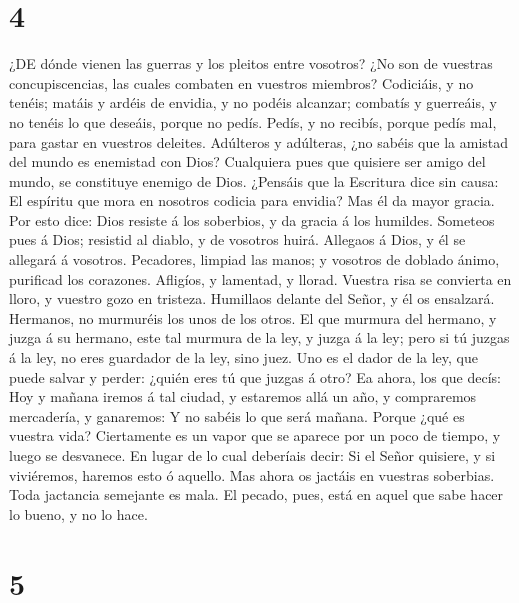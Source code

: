 \hypertarget{section-3}{%
\section{4}\label{section-3}}

 ¿DE dónde vienen las guerras y los pleitos entre vosotros?
¿No son de vuestras concupiscencias, las cuales combaten en vuestros
miembros?  Codiciáis, y no tenéis; matáis y ardéis de
envidia, y no podéis alcanzar; combatís y guerreáis, y no tenéis lo que
deseáis, porque no pedís.  Pedís, y no recibís, porque pedís
mal, para gastar en vuestros deleites.  Adúlteros y
adúlteras, ¿no sabéis que la amistad del mundo es enemistad con Dios?
Cualquiera pues que quisiere ser amigo del mundo, se constituye enemigo
de Dios.  ¿Pensáis que la Escritura dice sin causa: El
espíritu que mora en nosotros codicia para envidia?  Mas él
da mayor gracia. Por esto dice: Dios resiste á los soberbios, y da
gracia á los humildes.  Someteos pues á Dios; resistid al
diablo, y de vosotros huirá.  Allegaos á Dios, y él se
allegará á vosotros. Pecadores, limpiad las manos; y vosotros de doblado
ánimo, purificad los corazones.  Afligíos, y lamentad, y
llorad. Vuestra risa se convierta en lloro, y vuestro gozo en tristeza.
 Humillaos delante del Señor, y él os ensalzará.
 Hermanos, no murmuréis los unos de los otros. El que
murmura del hermano, y juzga á su hermano, este tal murmura de la ley, y
juzga á la ley; pero si tú juzgas á la ley, no eres guardador de la ley,
sino juez.  Uno es el dador de la ley, que puede salvar y
perder: ¿quién eres tú que juzgas á otro?  Ea ahora, los
que decís: Hoy y mañana iremos á tal ciudad, y estaremos allá un año, y
compraremos mercadería, y ganaremos:  Y no sabéis lo que
será mañana. Porque ¿qué es vuestra vida? Ciertamente es un vapor que se
aparece por un poco de tiempo, y luego se desvanece.  En
lugar de lo cual deberíais decir: Si el Señor quisiere, y si viviéremos,
haremos esto ó aquello.  Mas ahora os jactáis en vuestras
soberbias. Toda jactancia semejante es mala.  El pecado,
pues, está en aquel que sabe hacer lo bueno, y no lo hace.

\hypertarget{section-4}{%
\section{5}\label{section-4}}

